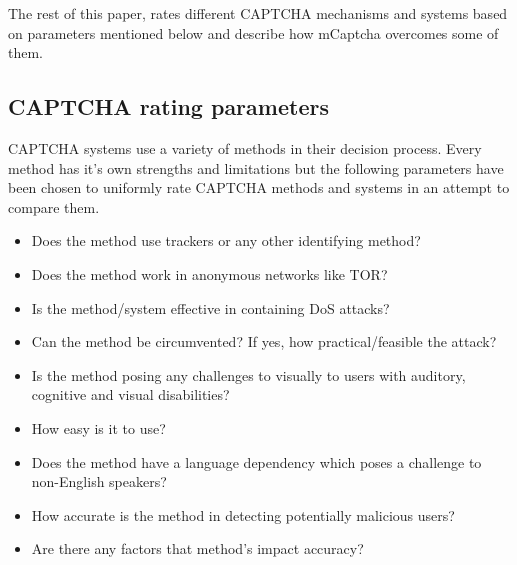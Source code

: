 \documentclass[conference]{IEEEtran}
\begin{document}
The rest of this paper, rates different CAPTCHA mechanisms and systems based on
parameters mentioned below and describe how mCaptcha overcomes some of
them. 

\subsection{CAPTCHA rating parameters}
CAPTCHA systems use a variety of methods in their decision process. Every method
has it's own strengths and limitations but the following parameters have been
chosen to uniformly rate CAPTCHA methods and systems in an attempt to compare
them.
\begin{description}
\item[Privacy] 
	\begin{itemize}
		\item Does the method use trackers or any other identifying method?
		\item Does the method work in anonymous networks like TOR?
	\end{itemize}
\item[Effectiveness]
	\begin{itemize}
		\item Is the method/system effective in containing DoS attacks? 
		\item Can the method be circumvented? If yes, how practical/feasible
		the attack?

	\end{itemize}
\item[Accessibility]
	\begin{itemize}
		\item Is the method posing any challenges to visually to users
			with auditory, cognitive and visual disabilities? 
		\item How easy is it to use?
		\item Does the method have a language dependency which poses a challenge to
		non-English speakers?
	\end{itemize}
\item[Accuracy]
	\begin{itemize}
		\item How accurate is the method in detecting potentially malicious
			users?
		\item Are there any factors that method's impact accuracy?
	\end{itemize}
\end{description}
\end{document}
